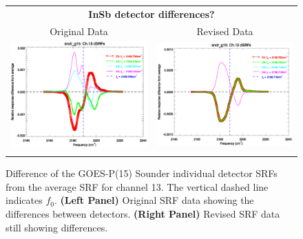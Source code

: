 \begin{figure}[htp]
  \centering
  \begin{tabular}{c c}
    \multicolumn{2}{c}{\textsf{\bfseries InSb detector differences?}} \\
    \hspace{1.5em}\textsf{Original Data} &
    \hspace{1.5em}\textsf{Revised Data} \\
    \includegraphics[scale=0.5,trim=0 40 0 0]{graphics/dsrf_anomaly/original/sndr_g15.ch13.srf.eps} &
    \includegraphics[scale=0.5,trim=0 40 0 0]{graphics/dsrf_anomaly/revised/sndr_g15.ch13.srf.eps} \\\\
  \end{tabular}
  \caption{Difference of the GOES-P(15) Sounder individual detector SRFs from the average SRF for channel 13. The vertical dashed line indicates $f_0$. \textbf{(Left Panel)} Original SRF data showing the differences between detectors. \textbf{(Right Panel)} Revised SRF data still showing differences.}
  \label{fig:sndr_g15.ch13.dsrf_anomaly}
\end{figure}



